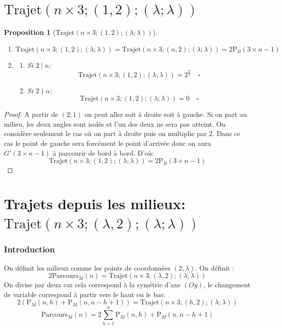 \documentclass[twoside, a4paper, 12pt]{report}
\newtheorem{property}[theorem]{Proposition}
\newcommand{\subcqfd}[1][\quad]{\ensuremath{#1\square}}
\newcommand{\trajet}[6]{\ensuremath{\text{Trajet}\left(#1 \times #2; (#3, #4); (#5; #6)\right)}}
\newcommand{\pb}[2]{\ensuremath{\text{P}_B\left(#1 \times #2\right)}}
\newcommand{\Pm}[1]{\ensuremath{\text{P}_M\left(#1\right)}}
\newcommand{\Pmtot}[1]{\ensuremath{\text{Parcours}_M\left(#1\right)}}
\begin{document}
\section{\trajet{n}{3}{1}{2}{\lambda}{\lambda}} \label{milieux_extremes}

\begin{property}[\trajet{n}{3}{1}{2}{\lambda}{\lambda}] \ \\
\begin{enumerate}
\item \[\trajet{n}{3}{1}{2}{\lambda}{\lambda} = \trajet{n}{3}{n}{2}{\lambda}{\lambda} = 2 \pb{3}{n-1}\]
\item
\begin{enumerate}
\item Si $2 \mid n$:
 \[\trajet{n}{3}{1}{2}{\lambda}{\lambda} = 2^\frac{n}{2}\subcqfd\]
\item Si $2 \nmid n$:
 \[\trajet{n}{3}{1}{2}{\lambda}{\lambda} = 0\subcqfd\]
\end{enumerate}
\end{enumerate}
\end{property}


\begin{proof}
A partir de $(2; 1)$ on peut aller soit à droite soit à gauche. Si on part au milieu, les deux angles sont isolés et l'un des deux ne sera pas atteint. On considère seulement le cas où on part à droite puis on multiplie par 2. Dans ce cas le point de gauche sera forcément le point d'arrivée donc on aura $G'(3 \times n-1)$ à parcourir de bord à bord. D'où:
\[\trajet{n}{3}{1}{2}{\lambda}{\lambda} = 2 \pb{3}{n-1}\]
\end{proof}


\section{Trajets depuis les milieux: \trajet{n}{3}{\lambda}{2}{\lambda}{\lambda}}
\subsubsection{Introduction}
On définit les milieux comme les points de coordonnées $(2, \lambda)$.
On définit : 
$$2\Pmtot{n} = \trajet{n}{3}{\lambda}{2}{\lambda}{\lambda}$$
On divise par deux car cela correspond à la symétrie d'axe $(Oy)$, le changement de variable correspond à partir vers le haut ou le bas:
$$2\left(\Pm{n, h} + \Pm{n, n-h+1} \right)= \trajet{n}{3}{h}{2}{\lambda}{\lambda}$$
$$\Pmtot{n} = 2\sum_{h=1}^{n} \Pm{n, h} + \Pm{n, n-h+1}$$
\end{document}
